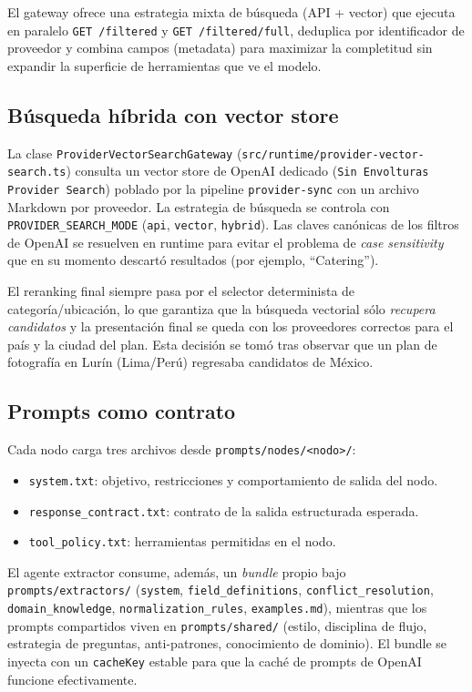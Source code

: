 \documentclass[11pt,a4paper]{article}
\begin{document}
El gateway ofrece una estrategia mixta de búsqueda (API + vector) que
ejecuta en paralelo \texttt{GET /filtered} y \texttt{GET /filtered/full},
deduplica por identificador de proveedor y combina campos
(metadata) para maximizar la completitud sin expandir la superficie de
herramientas que ve el modelo.

\subsection{Búsqueda híbrida con vector store}

La clase \texttt{ProviderVectorSearchGateway}
(\texttt{src/runtime/provider-vector-search.ts}) consulta un vector
store de OpenAI dedicado (\texttt{Sin Envolturas Provider Search})
poblado por la pipeline \texttt{provider-sync} con un archivo Markdown
por proveedor. La estrategia de búsqueda se controla con
\texttt{PROVIDER\_SEARCH\_MODE} (\texttt{api}, \texttt{vector},
\texttt{hybrid}). Las claves canónicas de los filtros de OpenAI se
resuelven en runtime para evitar el problema de \emph{case sensitivity}
que en su momento descartó resultados (por ejemplo, ``Catering'').

El reranking final siempre pasa por el selector determinista de
categoría/ubicación, lo que garantiza que la búsqueda vectorial sólo
\emph{recupera candidatos} y la presentación final se queda con los
proveedores correctos para el país y la ciudad del plan. Esta decisión
se tomó tras observar que un plan de fotografía en Lurín
(Lima/Perú) regresaba candidatos de México.

\subsection{Prompts como contrato}

Cada nodo carga tres archivos desde \texttt{prompts/nodes/<nodo>/}:

\begin{itemize}[leftmargin=*,itemsep=1pt]
  \item \texttt{system.txt}: objetivo, restricciones y comportamiento
        de salida del nodo.
  \item \texttt{response\_contract.txt}: contrato de la salida
        estructurada esperada.
  \item \texttt{tool\_policy.txt}: herramientas permitidas en el nodo.
\end{itemize}

El agente extractor consume, además, un \emph{bundle} propio bajo
\texttt{prompts/extractors/} (\texttt{system},
\texttt{field\_definitions}, \texttt{conflict\_resolution},
\texttt{domain\_knowledge}, \texttt{normalization\_rules},
\texttt{examples.md}), mientras que los prompts compartidos viven en
\texttt{prompts/shared/} (estilo, disciplina de flujo, estrategia de
preguntas, anti-patrones, conocimiento de dominio). El bundle se
inyecta con un \texttt{cacheKey} estable para que la caché de
prompts de OpenAI funcione efectivamente.
\end{document}
